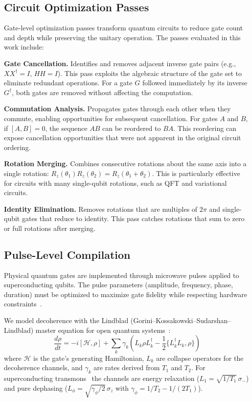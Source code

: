 \documentclass[sigconf,nonacm]{acmart}
\newcommand{\ham}{\mathcal{H}}
\begin{document}
\subsection{Circuit Optimization Passes}

Gate-level optimization passes transform quantum circuits to reduce gate count and depth while preserving the unitary operation. The passes evaluated in this work include:

\textbf{Gate Cancellation.} Identifies and removes adjacent inverse gate pairs (e.g., $XX^{\dagger} = I$, $HH = I$). This pass exploits the algebraic structure of the gate set to eliminate redundant operations. For a gate $G$ followed immediately by its inverse $G^{\dagger}$, both gates are removed without affecting the computation.

\textbf{Commutation Analysis.} Propagates gates through each other when they commute, enabling opportunities for subsequent cancellation. For gates $A$ and $B$, if $[A, B] = 0$, the sequence $AB$ can be reordered to $BA$. This reordering can expose cancellation opportunities that were not apparent in the original circuit ordering.

\textbf{Rotation Merging.} Combines consecutive rotations about the same axis into a single rotation: $R_z(\theta_1)R_z(\theta_2) = R_z(\theta_1 + \theta_2)$. This is particularly effective for circuits with many single-qubit rotations, such as QFT and variational circuits.

\textbf{Identity Elimination.} Removes rotations that are multiples of $2\pi$ and single-qubit gates that reduce to identity. This pass catches rotations that sum to zero or full rotations after merging.

\subsection{Pulse-Level Compilation}

Physical quantum gates are implemented through microwave pulses applied to superconducting qubits. The pulse parameters (amplitude, frequency, phase, duration) must be optimized to maximize gate fidelity while respecting hardware constraints~\cite{motzoi2009simple}.

We model decoherence with the Lindblad (Gorini--Kossakowski--Sudarshan--Lindblad) master equation for open quantum systems~\cite{lindblad1976generators,gorini1976completely}:
\begin{equation}
    \frac{d\rho}{dt} = -i[\ham, \rho] + \sum_k \gamma_k \left( L_k \rho L_k^{\dagger} - \frac{1}{2}\{L_k^{\dagger}L_k, \rho\} \right)
    \label{eq:lindblad}
\end{equation}
where $\ham$ is the gate's generating Hamiltonian, $L_k$ are collapse operators for the decoherence channels, and $\gamma_k$ are rates derived from $T_1$ and $T_2$. For superconducting transmons~\cite{koch2007transmon} the channels are energy relaxation ($L_1 = \sqrt{1/T_1}\,\sigma_-$) and pure dephasing ($L_\phi = \sqrt{\gamma_\phi/2}\,\sigma_z$ with $\gamma_\phi = 1/T_2 - 1/(2T_1)$).
\end{document}
